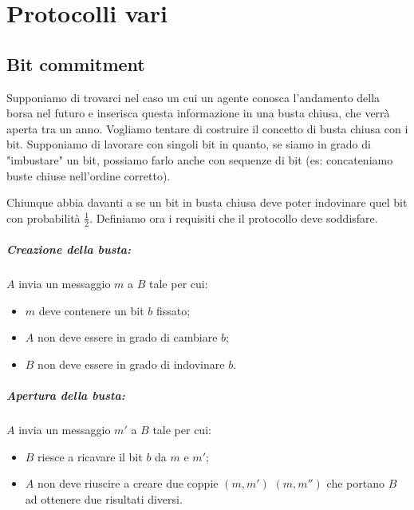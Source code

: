 \setchapterpreamble[u]{\margintoc}
\chapter{Protocolli vari}


 \section{Bit commitment}

Supponiamo di trovarci nel caso un cui un agente conosca l'andamento della borsa nel futuro e inserisca questa informazione in una busta chiusa, che verrà aperta tra un anno. Vogliamo tentare di costruire il concetto di busta chiusa con i bit. Supponiamo di lavorare con singoli bit in quanto, se siamo in grado di "imbustare" un bit, possiamo farlo anche con sequenze di bit (es: concateniamo buste chiuse nell'ordine corretto).

Chiunque abbia davanti a se un bit in busta chiusa deve poter indovinare quel bit con probabilità $\frac{1}{2}$. Definiamo ora i requisiti che il protocollo deve soddisfare.


\paragraph{Creazione della busta:} $A$ invia un messaggio $m$ a $B$ tale per cui:
\begin{itemize}
    \item $m$ deve contenere un bit $b$ fissato;
    \item $A$ non deve essere in grado di cambiare $b$;
    \item $B$ non deve essere in grado di indovinare $b$.
\end{itemize}
    
\paragraph{Apertura della busta: } $A$ invia un messaggio $m'$ a $B$ tale per cui:
\begin{itemize}
    \item $B$ riesce a ricavare il bit $b$ da $m$ e $m'$;
    \item $A$ non deve riuscire a creare due coppie $(m, m')$ $(m, m'')$ che portano $B$ ad ottenere due risultati diversi.
\end{itemize}

